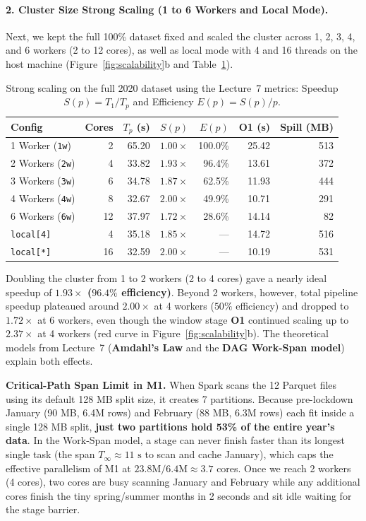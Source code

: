\documentclass[sigconf,nonacm]{acmart}
\begin{document}
\paragraph{2. Cluster Size Strong Scaling (1 to 6 Workers and Local Mode).}
Next, we kept the full 100\% dataset fixed and scaled the cluster across 1, 2, 3, 4, and 6 workers (2 to 12 cores), as well as local mode with 4 and 16 threads on the host machine (Figure~\ref{fig:scalability}b and Table~\ref{tab:cluster_scale}).
\begin{table}[b]
\centering
\caption{Strong scaling on the full 2020 dataset using the Lecture~7 metrics: Speedup $S(p) = T_1/T_p$ and Efficiency $E(p) = S(p)/p$.}
\label{tab:cluster_scale}
\vspace{-0.15cm}
\small
\setlength{\tabcolsep}{4pt}
\begin{tabular}{lrrrrrr}
\toprule
\textbf{Config} & \textbf{Cores} & \textbf{$T_p$ (s)} & \textbf{$S(p)$} & \textbf{$E(p)$} & \textbf{O1 (s)} & \textbf{Spill (MB)} \\
\midrule
1 Worker (\texttt{1w}) & 2 & 65.20 & $1.00\times$ & 100.0\% & 25.42 & 513 \\
2 Workers (\texttt{2w}) & 4 & 33.82 & $1.93\times$ & 96.4\% & 13.61 & 372 \\
3 Workers (\texttt{3w}) & 6 & 34.78 & $1.87\times$ & 62.5\% & 11.93 & 444 \\
4 Workers (\texttt{4w}) & 8 & 32.67 & $2.00\times$ & 49.9\% & 10.71 & 291 \\
6 Workers (\texttt{6w}) & 12 & 37.97 & $1.72\times$ & 28.6\% & 14.14 & 82 \\
\midrule
\texttt{local[4]} & 4 & 35.18 & $1.85\times$ & --- & 14.72 & 516 \\
\texttt{local[*]} & 16 & 32.59 & $2.00\times$ & --- & 10.19 & 531 \\
\bottomrule
\end{tabular}
\end{table}
Doubling the cluster from 1 to 2 workers (2 to 4 cores) gave a nearly ideal speedup of \textbf{$1.93\times$ ($96.4\%$ efficiency)}. Beyond 2 workers, however, total pipeline speedup plateaued around $2.00\times$ at 4 workers ($50\%$ efficiency) and dropped to $1.72\times$ at 6 workers, even though the window stage \textbf{O1} continued scaling up to $2.37\times$ at 4 workers (red curve in Figure~\ref{fig:scalability}b). The theoretical models from Lecture~7 (\textbf{Amdahl's Law} and the \textbf{DAG Work-Span model}) explain both effects.

\textbf{Critical-Path Span Limit in M1.} When Spark scans the 12 Parquet files using its default 128 MB split size, it creates 7 partitions. Because pre-lockdown January (90 MB, 6.4M rows) and February (88 MB, 6.3M rows) each fit inside a single 128 MB split, \textbf{just two partitions hold 53\% of the entire year's data}. In the Work-Span model, a stage can never finish faster than its longest single task (the span $T_\infty \approx 11\text{ s}$ to scan and cache January), which caps the effective parallelism of M1 at $23.8\text{M} / 6.4\text{M} \approx 3.7$ cores. Once we reach 2 workers (4 cores), two cores are busy scanning January and February while any additional cores finish the tiny spring/summer months in 2 seconds and sit idle waiting for the stage barrier.
\end{document}
